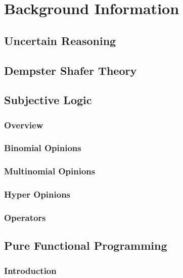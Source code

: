 \documentclass[thesis.tex]{subfiles}
\begin{document}
\chapter{Background Information}
\label{chap:background-information}



\section{Uncertain Reasoning}


\section{Dempster Shafer Theory}




\section{Subjective Logic}

\subsection{Overview}

\subsection{Binomial Opinions}

\subsection{Multinomial Opinions}

\subsection{Hyper Opinions}

\subsection{Operators}






\section{Pure Functional Programming}

\subsection{Introduction}
\end{document}
